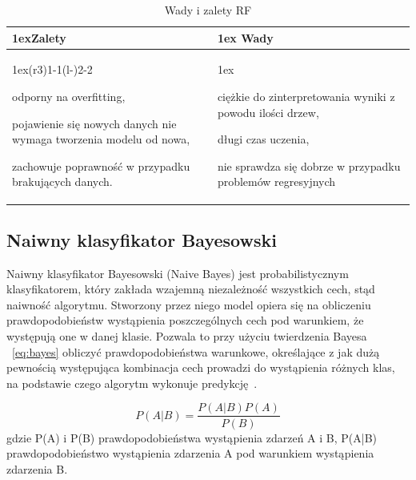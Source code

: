 \begin{table}[H]
    \begin{tabularx}{\linewidth}{>{\parskip1ex}X@{\kern4\tabcolsep}>{\parskip1ex}X}
    \toprule
    \hfil\bfseries Zalety
    &
    \hfil\bfseries Wady
    \\\cmidrule(r{3\tabcolsep}){1-1}\cmidrule(l{-\tabcolsep}){2-2}
    
    odporny na overfitting,\par
    pojawienie się nowych danych nie wymaga tworzenia modelu od nowa,\par
    zachowuje poprawność w przypadku brakujących danych.\par
    
    &
    
    ciężkie do zinterpretowania wyniki z powodu ilości drzew,\par
    długi czas uczenia,\par
    nie sprawdza się dobrze w przypadku problemów regresyjnych\par
    
    \\\bottomrule
    \end{tabularx}
    \caption{Wady i zalety RF}
\end{table}

\subsection{Naiwny klasyfikator Bayesowski}

Naiwny klasyfikator Bayesowski (Naive Bayes) jest probabilistycznym klasyfikatorem, który
zakłada wzajemną niezależność wszystkich cech, stąd naiwność algorytmu. Stworzony przez niego model
opiera się na obliczeniu prawdopodobieństw wystąpienia poszczególnych cech pod warunkiem, że 
występują one w danej klasie. Pozwala to przy użyciu twierdzenia Bayesa ~\ref{eq:bayes} obliczyć prawdopodobieństwa 
warunkowe, określające z jak dużą pewnością występująca kombinacja cech prowadzi do 
wystąpienia różnych klas, na podstawie czego algorytm wykonuje predykcję~\cite{MLAlgorithms}. 


\begin{equation}
    \label{eq:bayes}
    P(A|B) = \frac{P(A|B)P(A)}{P(B)}
\end{equation}
gdzie P(A) i P(B) prawdopodobieństwa wystąpienia zdarzeń A i B, P(A|B) prawdopodobieństwo wystąpienia
zdarzenia A pod warunkiem wystąpienia zdarzenia B.

